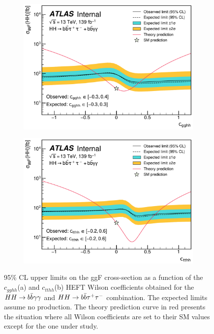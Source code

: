 \documentclass[twoside,11pt]{report}
\newcommand*{\hhtobbyy}{\ensuremath{\HH\rightarrow\bbyy}\xspace}
\newcommand*{\hhtobbtt}{\ensuremath{\HH\rightarrow\bbtautau}\xspace}
\newcommand*{\cgghh}{\ensuremath{c_{gghh}}\xspace}
\newcommand*{\ctthh}{\ensuremath{c_{tthh}}\xspace}
\begin{document}
\begin{figure}[tbh!]
    \centering
    \begin{subfigure}[t]{0.48\textwidth}
        \centering
        \includegraphics[width=\textwidth]{casual plots/combined_cgghh_limit_scan.pdf}
        \caption{}
    \end{subfigure}
    \begin{subfigure}[t]{0.48\textwidth}
        \centering
        \includegraphics[width=\textwidth]{casual plots/combined_ctthh_limit_scan.pdf}
        \caption{}
    \end{subfigure}
    \caption{95\% CL upper limits on the ggF \HH cross-section as a function of the \cgghh (a) and \ctthh (b) HEFT Wilson coefficients obtained for the \hhtobbyy and \hhtobbtt combination.
    The expected limits assume no \HH production.
    The theory prediction curve in red presents the situation where all Wilson coefficients are set to their SM values except for the one under study.
    }
    \label{fig:combined_scans}
\end{figure}
\end{document}
